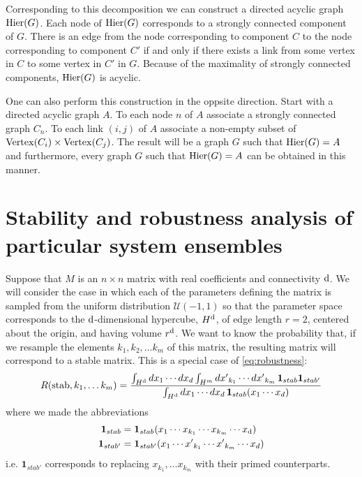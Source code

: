 Corresponding to this decomposition we can construct a directed acyclic graph $\mathrm{Hier} (G)$.  Each node of $\mathrm{Hier} (G)$ corresponds to a strongly connected component of $G$. There is an edge from the node corresponding to component $C$ to the node corresponding to component $C'$ if and only if there exists a link from some vertex in $C$ to some vertex in $C'$ in $G$.  Because of the maximality of strongly connected components, $\mathrm{Hier} (G)$ is acyclic.

One can also perform this construction in the oppsite direction.  Start with a directed acyclic graph $A$.  To each node $n$ of $A$ associate
a strongly connected graph $C_n$.  To each link $(i,j)$ of $A$ associate a non-empty subset of $\mathrm{Vertex}(C_i) \times \mathrm{Vertex}(C_j)$.  The result will be a graph $G$ such that $\mathrm{Hier}(G) = A$ and furthermore, every graph $G$ such that $\mathrm{Hier}(G) = A$ can be obtained in this manner.



\section{Stability and robustness analysis of particular system ensembles}
Suppose that $M$ is an $n \times n$ matrix with real coefficients and connectivity $\mathrm{d}$. We will consider the case in which each of the parameters defining the matrix is sampled from the uniform distribution $\mathcal{U}(-1,1)$ so that the parameter space corresponds to the $\mathrm{d}$-dimensional hypercube, $H^{\mathrm{d}}$, of edge length $r=2$, centered about the origin, and having volume $r^{\mathrm{d}}$.  We want to know the probability that, if we resample the elements $k_1, k_2, \ldots k_m$ of this matrix, the resulting matrix will correspond to a stable matrix.  This is a special case of \ref{eq:robustness}:
\begin{equation}\label{eq:condprobgen}
 R (\mathrm{stab}, k_1, \ldots k_m) =
  \frac{\int_{H^{\mathrm{d}}} dx_1 \cdots dx_d \int_{H^m} {dx'}_{k_1} \cdots {dx'}_{k_m}\,
    \mathbf{1}_{stab} \mathbf{1}_{stab'}}
  {\int_{H^{\mathrm{d}}} dx_1 \cdots dx_d  \, \mathbf{1}_{stab}(x_1 \cdots x_d)}
\end{equation}
where we made the abbreviations
\begin{align*}
\mathbf{1}_{stab} &= \mathbf{1}_{stab}(x_1 \cdots x_{k_1} \cdots x_{k_m} \cdots x_{\mathrm{d}}) \\
\mathbf{1}_{stab'} &= \mathbf{1}_{stab'}(x_1 \cdots {x'}_{k_1} \cdots {x'}_{k_m}  \cdots x_d)
\end{align*}
i.e. $\mathbf{1}_{stab'}$ corresponds to replacing $x_{k_1}, \ldots x_{k_m}$ with their primed counterparts.

